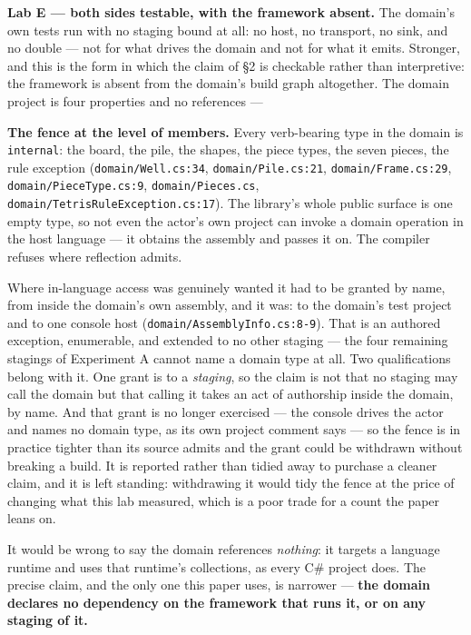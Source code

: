 \documentclass[
]{article}
\begin{document}
\textbf{Lab E --- both sides testable, with the framework absent.} The
domain's own tests run with no staging bound at all: no host, no
transport, no sink, and no double --- not for what drives the domain and
not for what it emits. Stronger, and this is the form in which the claim
of §2 is checkable rather than interpretive: the framework is absent
from the domain's build graph altogether. The domain project is four
properties and no references ---

\textbf{The fence at the level of members.} Every verb-bearing type in
the domain is \texttt{internal}: the board, the pile, the shapes, the
piece types, the seven pieces, the rule exception
(\texttt{domain/Well.cs:34}, \texttt{domain/Pile.cs:21},
\texttt{domain/Frame.cs:29}, \texttt{domain/PieceType.cs:9},
\texttt{domain/Pieces.cs}, \texttt{domain/TetrisRuleException.cs:17}).
The library's whole public surface is one empty type, so not even the
actor's own project can invoke a domain operation in the host language
--- it obtains the assembly and passes it on. The compiler refuses where
reflection admits.

Where in-language access was genuinely wanted it had to be granted by
name, from inside the domain's own assembly, and it was: to the domain's
test project and to one console host
(\texttt{domain/AssemblyInfo.cs:8-9}). That is an authored exception,
enumerable, and extended to no other staging --- the four remaining
stagings of Experiment A cannot name a domain type at all. Two
qualifications belong with it. One grant is to a \emph{staging}, so the
claim is not that no staging may call the domain but that calling it
takes an act of authorship inside the domain, by name. And that grant is
no longer exercised --- the console drives the actor and names no domain
type, as its own project comment says --- so the fence is in practice
tighter than its source admits and the grant could be withdrawn without
breaking a build. It is reported rather than tidied away to purchase a
cleaner claim, and it is left standing: withdrawing it would tidy the
fence at the price of changing what this lab measured, which is a poor
trade for a count the paper leans on.

It would be wrong to say the domain references \emph{nothing}: it
targets a language runtime and uses that runtime's collections, as every
C\# project does. The precise claim, and the only one this paper uses,
is narrower --- \textbf{the domain declares no dependency on the
framework that runs it, or on any staging of it.}
\end{document}
